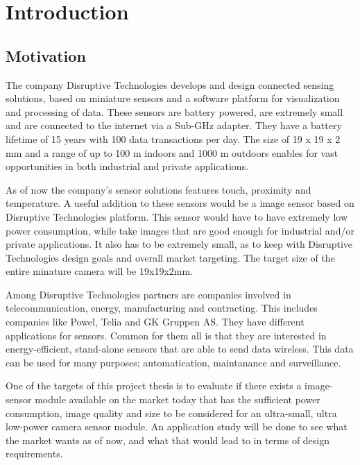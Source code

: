 \newpage
\section{Introduction}
\subsection{Motivation}
The company Disruptive Technologies develops and design connected sensing solutions, based on miniature sensors and a software platform for visualization and processing of data. These sensors are battery powered, are extremely small and are connected to the internet via a Sub-GHz adapter. They have a battery lifetime of 15 years with 100 data transactions per day. The size of 19 x 19 x 2 mm and a range of up to 100 m indoors and 1000 m outdoors enables for vast opportunities in both industrial and private applications.   

As of now the company's sensor solutions features touch, proximity and temperature. A useful addition to these sensors would be a image sensor based on Disruptive Technologies platform. This sensor would have to have extremely low power consumption, while take images that are good enough for industrial and/or private applications. It also has to be extremely small, as to keep with Disruptive Technologies design goals and overall market targeting. The target size of the entire minature camera will be 19x19x2mm. 

Among Disruptive Technologies partners are  companies involved in telecommunication, energy, manufacturing and contracting. This includes companies like Powel, Telia and GK Gruppen AS. They have different applications for sensors. Common for them all is that they are interested in energy-efficient, stand-alone sensors that are able to send data wireless. This data can be used for many purposes; automatication, maintanance and surveillance.    

One of the targets of this project thesis is to evaluate if there exists a image-sensor module available on the market today that has the sufficient power consumption, image quality and size to be considered for an ultra-small, ultra low-power camera sensor module. An application study will be done to see what the market wants as of now, and what that would lead to in terms of design requirements. 

